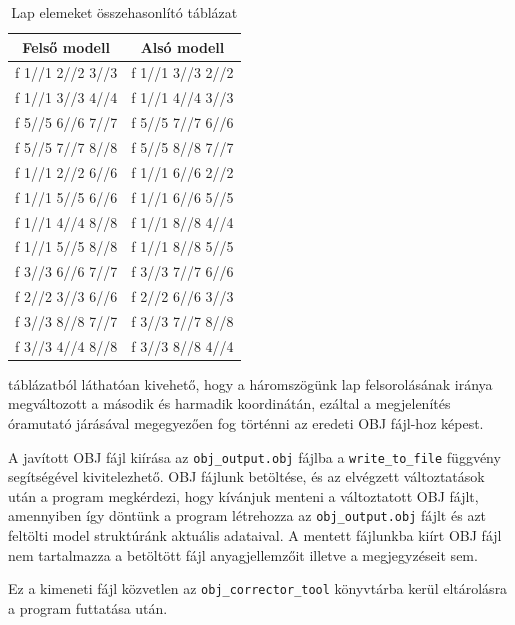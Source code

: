 \begin{table}[h]
\centering
\caption{Lap elemeket összehasonlító táblázat}
\bigskip
\begin{tabular}{|c|c|}
Felső modell& Alsó modell \\
\hline
f  1//1 2//2 3//3 & f  1//1 3//3 2//2 \\
f  1//1 3//3 4//4 & f  1//1 4//4 3//3 \\
f  5//5 6//6 7//7 & f  5//5 7//7 6//6 \\
f  5//5 7//7 8//8 & f  5//5 8//8 7//7 \\ 
f  1//1 2//2 6//6 & f  1//1 6//6 2//2 \\
f  1//1 5//5 6//6 & f  1//1 6//6 5//5 \\
f  1//1 4//4 8//8 & f  1//1 8//8 4//4 \\
f  1//1 5//5 8//8 & f  1//1 8//8 5//5 \\
f  3//3 6//6 7//7 & f  3//3 7//7 6//6 \\
f  2//2 3//3 6//6 & f  2//2 6//6 3//3 \\
f  3//3 8//8 7//7 & f  3//3 7//7 8//8 \\
f  3//3 4//4 8//8 & f  3//3 8//8 4//4 \\
\hline
\end{tabular}
\label{fig:bej3}
\end{table}
\bigskip 
\newpage
{} táblázatból láthatóan kivehető, hogy a háromszögünk lap felsorolásának iránya megváltozott a második és harmadik koordinátán, ezáltal a megjelenítés óramutató járásával megegyezően fog történni az eredeti OBJ fájl-hoz képest.


A javított OBJ fájl kiírása az \texttt{obj\_output.obj} fájlba a \texttt{write\_to\_file} függvény segítségével kivitelezhető. OBJ fájlunk betöltése, és az elvégzett változtatások után a program megkérdezi, hogy kívánjuk menteni a változtatott OBJ fájlt, amennyiben így döntünk a program létrehozza az \texttt{obj\_output.obj} fájlt és azt feltölti model struktúránk aktuális adataival. A mentett fájlunkba kiírt OBJ fájl nem tartalmazza a betöltött fájl anyagjellemzőit illetve a megjegyzéseit sem.
\bigskip
{}
\bigskip

Ez a kimeneti fájl közvetlen az \texttt{obj\_corrector\_tool} könyvtárba kerül eltárolásra a program futtatása után.
